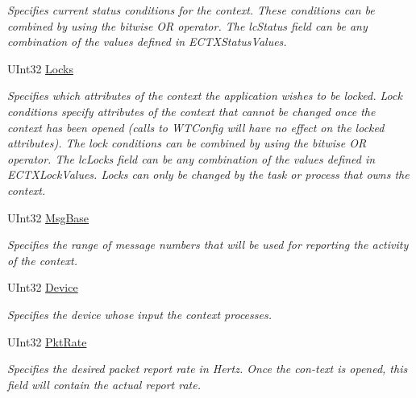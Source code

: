 \begin{DoxyCompactItemize}
\begin{DoxyCompactList}\small\item\em Specifies current status conditions for the context. These conditions can be combined by using the bitwise OR operator. The lc\+Status field can be any combination of the values defined in E\+C\+T\+X\+Status\+Values. \end{DoxyCompactList}\item 
U\+Int32 \mbox{\hyperlink{class_wintab_d_n_1_1_c_wintab_context_ab05bc9afc19654c5495adfb60efdc06d}{Locks}}
\begin{DoxyCompactList}\small\item\em Specifies which attributes of the context the application wishes to be locked. Lock conditions specify attributes of the context that cannot be changed once the context has been opened (calls to W\+T\+Config will have no effect on the locked attributes). The lock conditions can be combined by using the bitwise OR operator. The lc\+Locks field can be any combination of the values defined in E\+C\+T\+X\+Lock\+Values. Locks can only be changed by the task or process that owns the context. \end{DoxyCompactList}\item 
U\+Int32 \mbox{\hyperlink{class_wintab_d_n_1_1_c_wintab_context_a074fcb0607df8048600719c8875b12a7}{Msg\+Base}}
\begin{DoxyCompactList}\small\item\em Specifies the range of message numbers that will be used for reporting the activity of the context. \end{DoxyCompactList}\item 
U\+Int32 \mbox{\hyperlink{class_wintab_d_n_1_1_c_wintab_context_a1f56c63dab67a86ba44b53bce0bc882a}{Device}}
\begin{DoxyCompactList}\small\item\em Specifies the device whose input the context processes. \end{DoxyCompactList}\item 
U\+Int32 \mbox{\hyperlink{class_wintab_d_n_1_1_c_wintab_context_a20f3b1ba020637ac525e1a2f0a67011f}{Pkt\+Rate}}
\begin{DoxyCompactList}\small\item\em Specifies the desired packet report rate in Hertz. Once the con-\/text is opened, this field will contain the actual report rate. \end{DoxyCompactList}\item 

\end{DoxyCompactItemize}

